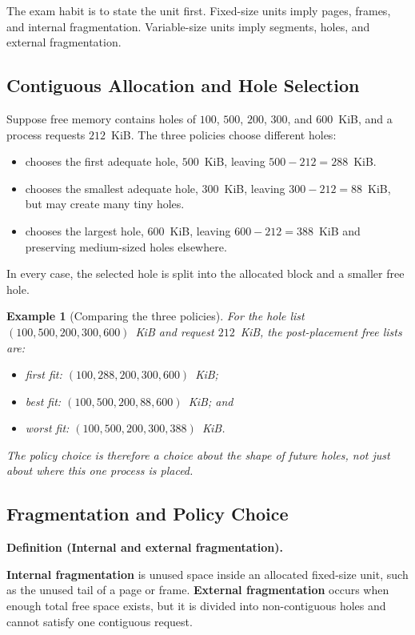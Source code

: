 \documentclass[11pt]{article}
\newtheorem{example}{Example}[section]
\newenvironment{definitionbox}[1]{%
  \par\noindent\textbf{Definition (#1).}\ \itshape
}{\par\vspace{0.3em}}
\begin{document}
The exam habit is to state the unit first. Fixed-size units imply pages,
frames, and internal fragmentation. Variable-size units imply segments,
holes, and external fragmentation.

\subsection{Contiguous Allocation and Hole Selection}

Suppose free memory contains holes of $100$, $500$, $200$, $300$, and
$600$~KiB, and a process requests $212$~KiB. The three policies choose
different holes:
\begin{itemize}
  \item {} chooses the first adequate hole, $500$~KiB, leaving
        $500-212=288$~KiB.
  \item {} chooses the smallest adequate hole, $300$~KiB, leaving
        $300-212=88$~KiB, but may create many tiny holes.
  \item {} chooses the largest hole, $600$~KiB, leaving
        $600-212=388$~KiB and preserving medium-sized holes elsewhere.
\end{itemize}
In every case, the selected hole is split into the allocated block and a
smaller free hole.

\begin{example}[Comparing the three policies]
\label{ex:allocation}
For the hole list $(100,500,200,300,600)$~KiB and request $212$~KiB, the
post-placement free lists are:
\begin{itemize}
  \item first fit: $(100,288,200,300,600)$~KiB;
  \item best fit: $(100,500,200,88,600)$~KiB; and
  \item worst fit: $(100,500,200,300,388)$~KiB.
\end{itemize}
The policy choice is therefore a choice about the shape of future holes, not
just about where this one process is placed.
\end{example}

\subsection{Fragmentation and Policy Choice}

\begin{definitionbox}{Internal and external fragmentation}
\textbf{Internal fragmentation} is unused space inside an allocated
fixed-size unit, such as the unused tail of a page or frame. \textbf{External
fragmentation} occurs when enough total free space exists, but it is divided
into non-contiguous holes and cannot satisfy one contiguous request.
\end{definitionbox}
\end{document}
